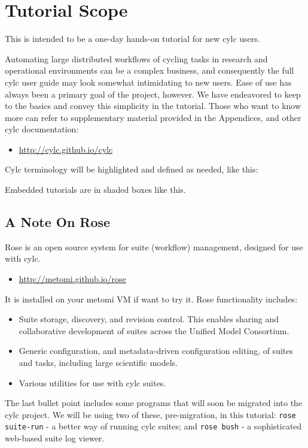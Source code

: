 \section{Tutorial Scope}

This is intended to be a one-day hands-on tutorial for new cylc users.

Automating large distributed workflows of cycling tasks in research and
operational environments can be a complex business, and consequently the full
cylc user guide may look somewhat intimidating to new users.  Ease of use
has always been a primary goal of the project, however.  We have endeavored to
keep to the basics and convey this simplicity in the tutorial. Those who want
to know more can refer to supplementary material provided in the Appendices,
and other cylc documentation:

\begin{itemize}
    \item \url{http://cylc.github.io/cylc}
\end{itemize}

Cylc terminology will be highlighted and defined as needed, like this:


\begin{shaded*}
Embedded tutorials are in shaded boxes like this.
\end{shaded*}

\subsection{A Note On Rose}

Rose is an open source system for suite (workflow) management, designed for use
with cylc.
\begin{itemize}
     \item \url{http://metomi.github.io/rose}
\end{itemize}
 
It is installed on your metomi VM if want to try it.  Rose functionality
includes:
\begin{itemize}
    \item Suite storage, discovery, and revision control.  This enables sharing
        and collaborative development of suites across the Unified Model
        Consortium.
    \item Generic configuration, and metadata-driven configuration editing, of
        suites and tasks, including large scientific models.
    \item Various utilities for use with cylc suites.
\end{itemize}

The last bullet point includes some programs that will soon be migrated into
the cylc project.  We will be using two of these, pre-migration, in this
tutorial: \lstinline{rose suite-run} - a better way of running cylc suites; and
\lstinline{rose bush} - a sophisticated web-based suite log viewer.
